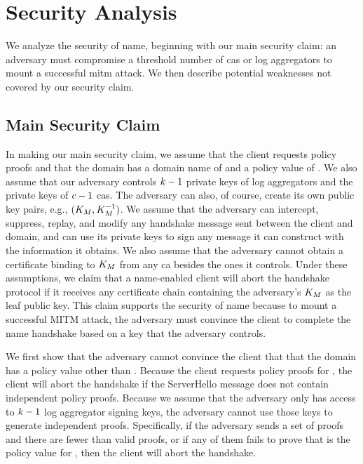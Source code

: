 \section{Security Analysis}
\label{sec:analysis}

We analyze the security of \ac{name}, beginning with
our main security claim: an adversary must compromise a threshold number
of \acp{ca} or log aggregators to mount a successful \ac{mitm} attack.
We then describe potential weaknesses not covered by our security claim.

\subsection{Main Security Claim}
\label{sec:analysis:informal}

In making our main security claim, we assume that the client requests \numlas
policy proofs and that the domain has a domain name of \domain and a policy
value of \policy. 
We also assume that our adversary controls $k - 1$ private keys of log
aggregators and the private keys of $c - 1$ \acp{ca}. The adversary can
also, of course, create its own public key pairs, e.g., $(K_M,
K_M^{-1})$.
We assume that the adversary can intercept, suppress, replay, and modify any
handshake message sent between the client and domain, and can use its private
keys to sign any message it can construct with the information it obtains. We
also assume that the adversary cannot obtain a certificate binding \domain to
$K_M$ from any \ac{ca} besides the ones it controls. Under these
assumptions, we claim that a \ac{name}-enabled client will abort the handshake
protocol if it receives any certificate chain containing the adversary's
$K_M$ as the leaf public key. This claim supports the security of
\ac{name} because to mount a successful MITM attack, the adversary must convince
the client to complete the \ac{name} handshake based on a key that the adversary
controls.

We first show that the adversary cannot convince the client that that the domain
has a policy value other than \policy. Because the client requests \numlas
policy proofs for \domain, the client will abort the handshake if the 
ServerHello message does not contain \numlas independent policy
proofs. Because we assume that the adversary only has access to $k - 1$
log aggregator signing keys, the adversary cannot use those keys to
generate \numlas independent proofs. Specifically, if the adversary sends a set
of proofs and there are fewer than \numlas valid proofs, or if any of them fails
to prove that \policy is the policy value for \domain, then the client will
abort the handshake.

